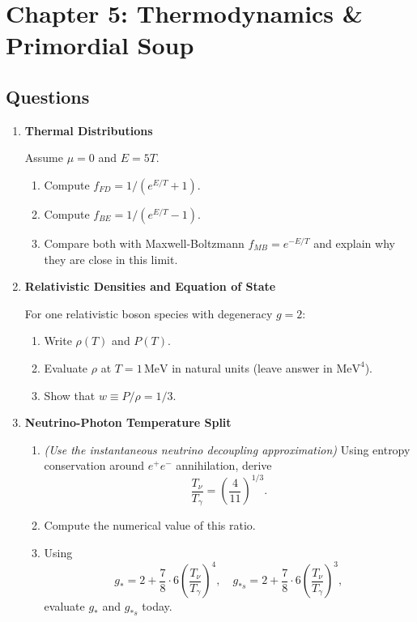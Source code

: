 \clearpage
\section{Chapter 5: Thermodynamics \& Primordial Soup}

\subsection{Questions}

\begin{enumerate}[label=5.\arabic*]
  \item \label{q:5.1} \textbf{Thermal Distributions}

  Assume $\mu=0$ and $E=5T$.
  \begin{enumerate}[label=(\alph*)]
    \item Compute $f_{FD}=1/(e^{E/T}+1)$.
    \item Compute $f_{BE}=1/(e^{E/T}-1)$.
    \item Compare both with Maxwell-Boltzmann $f_{MB}=e^{-E/T}$ and explain why they are close in this limit.
  \end{enumerate}

  \item \label{q:5.2} \textbf{Relativistic Densities and Equation of State}

  For one relativistic boson species with degeneracy $g=2$:
  \begin{enumerate}[label=(\alph*)]
    \item Write $\rho(T)$ and $P(T)$.
    \item Evaluate $\rho$ at $T=1\,\mathrm{MeV}$ in natural units (leave answer in $\mathrm{MeV}^4$).
    \item Show that $w\equiv P/\rho=1/3$.
  \end{enumerate}

  \item \label{q:5.3} \textbf{Neutrino-Photon Temperature Split}

  \begin{enumerate}[label=(\alph*)]
    \item \textit{(Use the instantaneous neutrino decoupling approximation)} Using entropy conservation around $e^+e^-$ annihilation, derive
    \[
      \frac{T_\nu}{T_\gamma}=\left(\frac{4}{11}\right)^{1/3}.
    \]
    \item Compute the numerical value of this ratio.
    \item Using
    \[
      g_*=2+\frac{7}{8}\cdot 6\left(\frac{T_\nu}{T_\gamma}\right)^4,
      \quad
      g_{*s}=2+\frac{7}{8}\cdot 6\left(\frac{T_\nu}{T_\gamma}\right)^3,
    \]
    evaluate $g_*$ and $g_{*s}$ today.
  \end{enumerate}


\end{enumerate}
